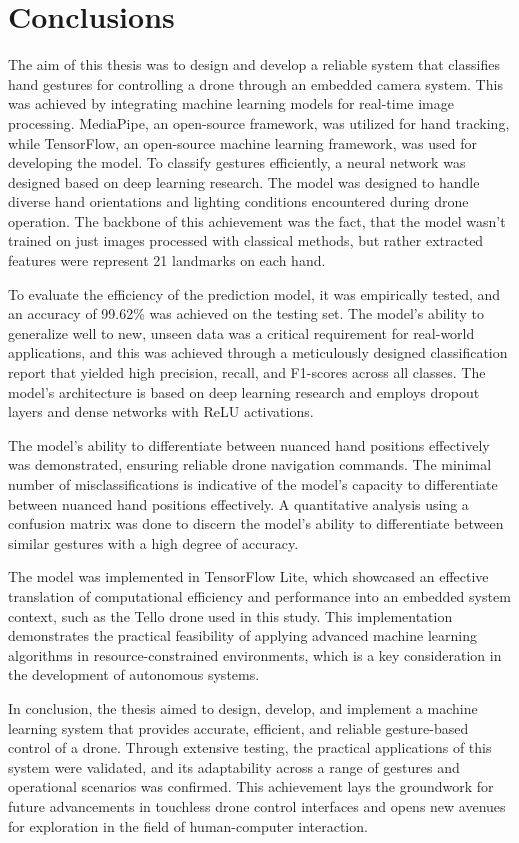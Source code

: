 \chapter{Conclusions}
The aim of this thesis was to design and develop a reliable system that classifies hand gestures for controlling a drone through an embedded camera system. This was achieved by integrating machine learning models for real-time image processing. MediaPipe, an open-source framework, was utilized for hand tracking, while TensorFlow, an open-source machine learning framework, was used for developing the model. To classify gestures efficiently, a neural network was designed based on deep learning research. The model was designed to handle diverse hand orientations and lighting conditions encountered during drone operation. The backbone of this achievement was the fact, that the model wasn't trained on just images processed with classical methods, but rather extracted features were represent 21 landmarks on each hand.

To evaluate the efficiency of the prediction model, it was empirically tested, and an accuracy of 99.62\% was achieved on the testing set. The model's ability to generalize well to new, unseen data was a critical requirement for real-world applications, and this was achieved through a meticulously designed classification report that yielded high precision, recall, and F1-scores across all classes. The model's architecture is based on deep learning research and employs dropout layers and dense networks with ReLU activations.

The model's ability to differentiate between nuanced hand positions effectively was demonstrated, ensuring reliable drone navigation commands. The minimal number of misclassifications is indicative of the model's capacity to differentiate between nuanced hand positions effectively. A quantitative analysis using a confusion matrix was done to discern the model's ability to differentiate between similar gestures with a high degree of accuracy.

The model was implemented in TensorFlow Lite, which showcased an effective translation of computational efficiency and performance into an embedded system context, such as the Tello drone used in this study. This implementation demonstrates the practical feasibility of applying advanced machine learning algorithms in resource-constrained environments, which is a key consideration in the development of autonomous systems.

In conclusion, the thesis aimed to design, develop, and implement a machine learning system that provides accurate, efficient, and reliable gesture-based control of a drone. Through extensive testing, the practical applications of this system were validated, and its adaptability across a range of gestures and operational scenarios was confirmed. This achievement lays the groundwork for future advancements in touchless drone control interfaces and opens new avenues for exploration in the field of human-computer interaction.
\clearpage